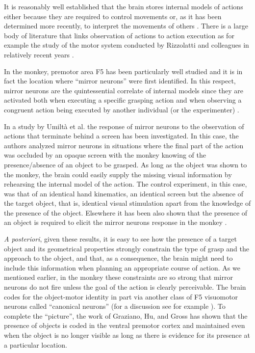 It is reasonably well established that the brain stores internal
models of actions either because they are required to control
movements or, as it has been determined more recently, to interpret
the movements of others \cite{kawato-99, wolpert-03, mussaivaldi-00,
lackner-98}.  There is a large body of literature that links
observation of actions to action execution as for example the study of
the motor system conducted by Rizzolatti and colleagues in relatively
recent years
\cite{rizzolatti-04,gallese-96,rizzolatti-01}.

In the monkey, premotor area F5 has been particularly well studied and
it is in fact the location where ``mirror neurons'' were first
identified. In this respect, mirror neurons are the quintessential
correlate of internal models since they are activated both when
executing a specific grasping action and when observing a congruent
action being executed by another individual (or the experimenter)
\cite{fadiga-00}.

In a study by Umilt\`a et al. \cite{umilta-01} the response of mirror
neurons to the observation of actions that terminate behind a screen
has been investigated. In this case, the authors analyzed mirror
neurons in situations where the final part of the action was occluded
by an opaque screen with the monkey knowing of the presence/absence of
an object to be grasped. As long as the object was shown to the
monkey, the brain could easily supply the missing visual information
by rehearsing the internal model of the action. The control
experiment, in this case, was that of an identical hand kinematics, an
identical screen but the absence of the target object, that is,
identical visual stimulation apart from the knowledge of the presence
of the object. Elsewhere it has been also shown that the presence of
an object is required to elicit the mirror neurons response in the
monkey \cite{gallese-96}.

{\em A posteriori}, given these results, it is easy to see how the
presence of a target object and its geometrical properties strongly
constrain the type of grasp and the approach to the object, and that,
as a consequence, the brain might need to include this information
when planning an appropriate course of action.  As we mentioned
earlier, in the monkey these constraints are so strong that mirror
neurons do not fire unless the goal of the action is clearly
perceivable. The brain codes for the object-motor identity in part via
another class of F5 visuomotor neurons called ``canonical neurons''
(for a discussion see for example \cite{metta-06}).  To complete the
``picture'', the work of Graziano, Hu, and Gross \cite{graziano-97}
has shown that the presence of objects is coded in the ventral
premotor cortex and maintained even when the object is no longer
visible as long as there is evidence for its presence at a particular
location.


